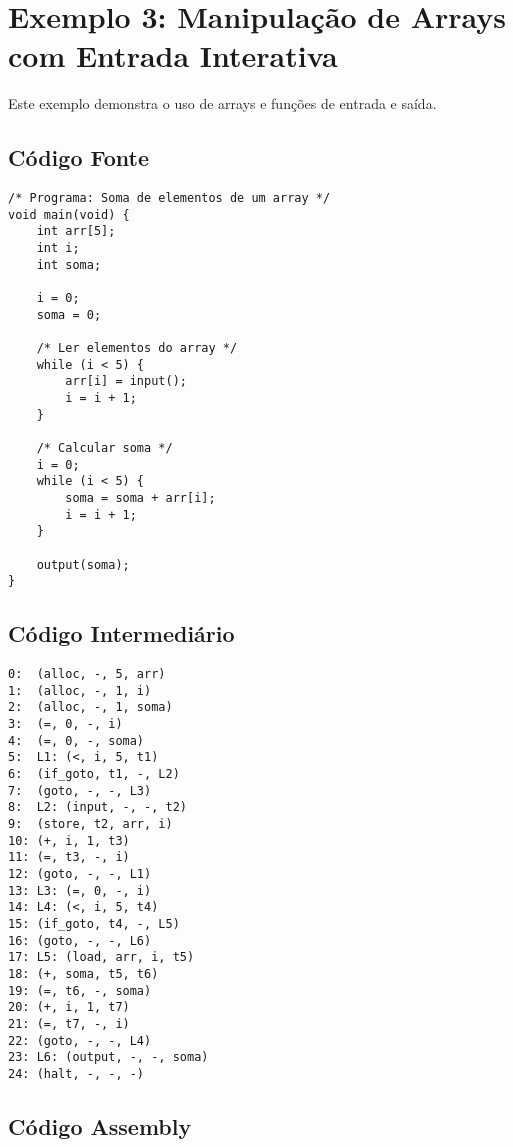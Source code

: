 \documentclass[
	12pt,				%
	oneside,
	a4paper,			%
	english,			%
	french,				%
	spanish,			%
	brazil,				%
	]{abntex2}
\begin{document}
\section{Exemplo 3: Manipulação de Arrays com Entrada Interativa}

Este exemplo demonstra o uso de arrays e funções de entrada e saída.

\subsection{Código Fonte}

\begin{lstlisting}[style=cstyle, caption=Exemplo 3: Código fonte C-]
/* Programa: Soma de elementos de um array */
void main(void) {
    int arr[5];
    int i;
    int soma;
    
    i = 0;
    soma = 0;
    
    /* Ler elementos do array */
    while (i < 5) {
        arr[i] = input();
        i = i + 1;
    }
    
    /* Calcular soma */
    i = 0;
    while (i < 5) {
        soma = soma + arr[i];
        i = i + 1;
    }
    
    output(soma);
}
\end{lstlisting}

\subsection{Código Intermediário}

\begin{lstlisting}[style=cstyle, caption=Exemplo 3: Código intermediário (quádruplas)]
0:  (alloc, -, 5, arr)
1:  (alloc, -, 1, i)
2:  (alloc, -, 1, soma)
3:  (=, 0, -, i)
4:  (=, 0, -, soma)
5:  L1: (<, i, 5, t1)
6:  (if_goto, t1, -, L2)
7:  (goto, -, -, L3)
8:  L2: (input, -, -, t2)
9:  (store, t2, arr, i)
10: (+, i, 1, t3)
11: (=, t3, -, i)
12: (goto, -, -, L1)
13: L3: (=, 0, -, i)
14: L4: (<, i, 5, t4)
15: (if_goto, t4, -, L5)
16: (goto, -, -, L6)
17: L5: (load, arr, i, t5)
18: (+, soma, t5, t6)
19: (=, t6, -, soma)
20: (+, i, 1, t7)
21: (=, t7, -, i)
22: (goto, -, -, L4)
23: L6: (output, -, -, soma)
24: (halt, -, -, -)
\end{lstlisting}

\subsection{Código Assembly}

% 
\end{document}
